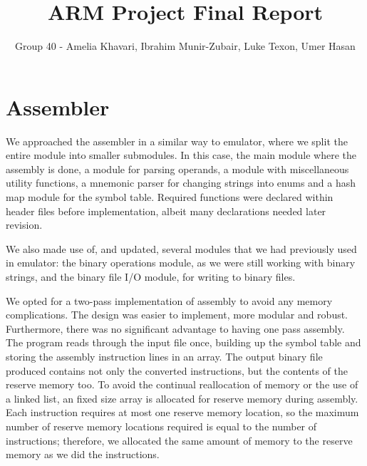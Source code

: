 \documentclass[11pt]{article}
\begin{document}
\title{ARM Project Final Report}
\author{Group 40 - Amelia Khavari, Ibrahim Munir-Zubair, Luke Texon, Umer Hasan}

\maketitle

\section{Assembler}
We approached the assembler in a similar way to emulator, where we split the 
entire module into smaller submodules. In this case, the main module where the assembly is done, 
a module for parsing operands, a module with miscellaneous utility functions, 
a mnemonic parser for changing strings into enums and 
a hash map module for the symbol table. Required functions were declared within header files 
before implementation, albeit many declarations needed later revision.

We also made use of, and updated, several modules that we had previously used in emulator: 
the binary operations module, as we were still working with binary strings, 
and the binary file I/O module, for writing to binary files.     

We opted for a two-pass implementation of assembly to avoid any memory complications. The design was easier to implement, more modular and robust. Furthermore, there was no significant advantage to having one pass assembly. 
The program reads through the input file once, building up the symbol table and storing the assembly instruction lines in an array. The output binary file produced contains not only the converted instructions, but the contents of the reserve memory too. To avoid the continual reallocation of memory or the use of a linked list, an fixed size array is allocated for reserve memory during assembly. Each instruction requires at most one reserve memory location, so the maximum number of reserve memory locations required is equal to the number of instructions; therefore, we allocated the same amount of memory to the reserve memory as we did the instructions.
\end{document}
